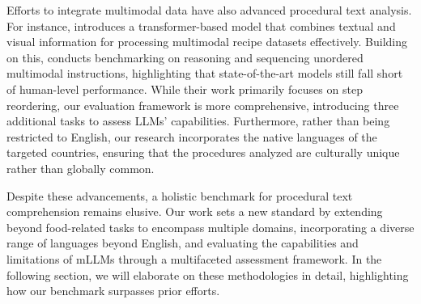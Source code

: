 Efforts to integrate multimodal data have also advanced procedural text analysis. For instance, \citep{10.1145/3397271.3401247} introduces a transformer-based model that combines textual and visual information for processing multimodal recipe datasets effectively. Building on this, \citep{wu-etal-2022-understanding} conducts benchmarking on reasoning and sequencing unordered multimodal instructions, highlighting that state-of-the-art models still fall short of human-level performance. While their work primarily focuses on step reordering, our evaluation framework is more comprehensive, introducing three additional tasks to assess LLMs’ capabilities. Furthermore, rather than being restricted to English, our research incorporates the native languages of the targeted countries, ensuring that the procedures analyzed are culturally unique rather than globally common.

Despite these advancements, a holistic benchmark for procedural text comprehension remains elusive. Our work sets a new standard by extending beyond food-related tasks to encompass multiple domains, incorporating a diverse range of languages beyond English, and evaluating the capabilities and limitations of mLLMs through a multifaceted assessment framework. In the following section, we will elaborate on these methodologies in detail, highlighting how our benchmark surpasses prior efforts.

